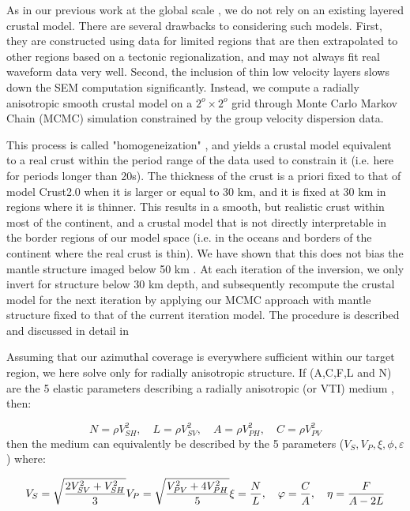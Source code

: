 \documentclass[12pt]{article}
\begin{document}
As in our previous work at the global scale \citep{french2013waveform,french2014whole}, we do not rely on an existing layered crustal model. 
There are several drawbacks to considering such models. 
First, they are constructed using data for limited regions that are then extrapolated to other regions based on a tectonic regionalization, and may not always fit real waveform data very well. 
Second, the inclusion of thin low velocity layers slows down the SEM computation significantly. 
Instead, we compute a radially anisotropic smooth crustal model on a $2^o \times 2^o $ grid through Monte Carlo Markov Chain (MCMC) simulation constrained by the group velocity dispersion data. 

This process is called "homogeneization" \citep[e.g.][]{backus1962long,capdeville2008shallow}, and yields a crustal model equivalent to a real crust within the period range of the data used to constrain it (i.e. here for periods longer than 20s). 
The thickness of the crust is a priori fixed to that of model Crust2.0 \citep{basscrust2} when it is larger or equal to 30 km, and it is fixed at 30 km in regions where it is thinner. 
This results in a smooth, but realistic crust within most of the continent, and a crustal model that is not directly interpretable in the border regions of our model space (i.e. in the oceans and borders of the continent where the real crust is thin). 
We have shown that this does not bias the mantle structure imaged below 50 km \citep{french2014whole}. 
At each iteration of the inversion, we only invert for structure below 30 km depth, and subsequently recompute the crustal model for the next iteration by applying our MCMC approach with mantle structure fixed to that of the current iteration model. 
The procedure is described and discussed in detail in \cite{french2014whole}

Assuming that our azimuthal coverage is everywhere sufficient within our target region, we here solve only for radially anisotropic structure. If (A,C,F,L and N) are the 5 elastic parameters describing a radially anisotropic (or VTI) medium \citep{love2013treatise}, then:

\begin{equation}
 N = \rho V^{2}_{SH}, \quad L = \rho V^{2}_{SV}, \quad A = \rho V^{2}_{PH} , \quad C = \rho V^{2}_{PV} 
 \end{equation}
then the medium can equivalently be described by the 5 parameters ($V_{S}, V_{P}, \xi, \phi, \varepsilon$) where:

\begin{equation}
V_{S} = \sqrt{\frac{2V^{2}_{SV}+V^{2}_{SH}} {3}} \\
V_{P} = \sqrt{\frac{V^{2}_{PV} + 4V^{2}_{PH}}{5}}
 \xi = \frac{N}{L}, \quad \varphi = \frac{C}{A}, \quad \eta = \frac{F}{A-2L} 
 \end{equation}
\end{document}
